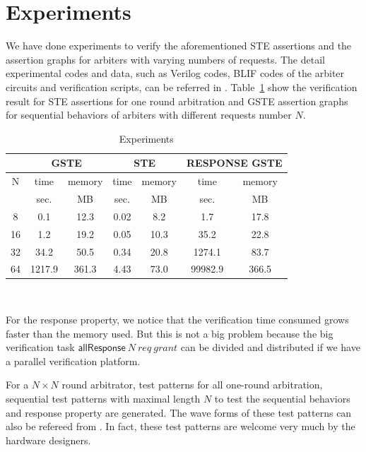 \documentclass[final]{IEEEtran}
\begin{document}
\section{Experiments}\label{sec:experiments}

We have done experiments to verify the aforementioned STE assertions
and the assertion graphs for arbiters with varying numbers of
requests. The detail experimental codes and data, such as Verilog
codes, BLIF codes of the arbiter circuits and verification scripts,
can be referred in \cite{Li11ArbiterExperiments}.
Table~\ref{steGsteExperiments} show the verification result for STE
assertions for one round arbitration and GSTE assertion graphs for
sequential behaviors of arbiters with different requests number $N$.

\begin{table}
\caption{Experiments}
\label{steGsteExperiments}
\begin{tabular}{||c||c|c||c|c||c|c||}
\hline \hline
\multicolumn{1}{||c||}{ } & \multicolumn{2}{|c||}{GSTE} & \multicolumn{2}{|c||}{STE} & \multicolumn{2}{|c||}{RESPONSE GSTE} \\
\hline
N & time & memory & time & memory & time & memory\\
       & sec. & MB & sec. & MB & sec. & MB \\
\hline \hline
8 & 0.1 & 12.3 & 0.02 & 8.2 & 1.7 & 17.8\\
16 & 1.2 & 19.2 & 0.05 & 10.3 &35.2 & 22.8\\
32 & 34.2 & 50.5 & 0.34 & 20.8 &1274.1 & 83.7\\
64 & 1217.9 & 361.3 & 4.43 & 73.0 & 99982.9 & 366.5\\
\hline \hline
\end{tabular}\\
\end{table}
For the response property,  we notice that the verification time consumed grows faster than the memory used. %
But this is not a big problem because the big verification task
$\mathsf{allResponse} \     N\ req\ grant$
can be divided and distributed if we have a parallel verification platform. %

For a $N \times N$ round arbitrator, test patterns for all one-round
arbitration,   sequential test patterns  with maximal length $N$ to
test the sequential behaviors and response property are generated.
The wave forms of these test patterns can also be refereed from
\cite{Li11ArbiterExperiments}. In fact, these test patterns are
welcome very much by the hardware designers.
\end{document}
